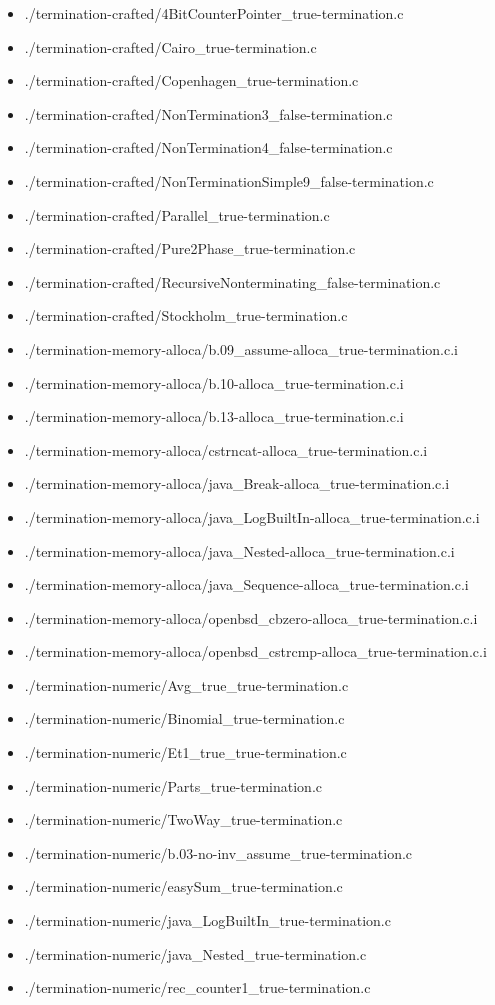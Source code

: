 \documentclass[envcountsame]{llncs}
\begin{document}
\begin{itemize}
\item ./termination-crafted/4BitCounterPointer\_true-termination.c
\item ./termination-crafted/Cairo\_true-termination.c
\item ./termination-crafted/Copenhagen\_true-termination.c
\item ./termination-crafted/NonTermination3\_false-termination.c
\item ./termination-crafted/NonTermination4\_false-termination.c
\item ./termination-crafted/NonTerminationSimple9\_false-termination.c
\item ./termination-crafted/Parallel\_true-termination.c
\item ./termination-crafted/Pure2Phase\_true-termination.c
\item ./termination-crafted/RecursiveNonterminating\_false-termination.c
\item ./termination-crafted/Stockholm\_true-termination.c


\item ./termination-memory-alloca/b.09\_assume-alloca\_true-termination.c.i
\item ./termination-memory-alloca/b.10-alloca\_true-termination.c.i
\item ./termination-memory-alloca/b.13-alloca\_true-termination.c.i
\item ./termination-memory-alloca/cstrncat-alloca\_true-termination.c.i
\item ./termination-memory-alloca/java\_Break-alloca\_true-termination.c.i
\item ./termination-memory-alloca/java\_LogBuiltIn-alloca\_true-termination.c.i
\item ./termination-memory-alloca/java\_Nested-alloca\_true-termination.c.i
\item ./termination-memory-alloca/java\_Sequence-alloca\_true-termination.c.i
\item ./termination-memory-alloca/openbsd\_cbzero-alloca\_true-termination.c.i
\item ./termination-memory-alloca/openbsd\_cstrcmp-alloca\_true-termination.c.i


\item ./termination-numeric/Avg\_true\_true-termination.c
\item ./termination-numeric/Binomial\_true-termination.c
\item ./termination-numeric/Et1\_true\_true-termination.c
\item ./termination-numeric/Parts\_true-termination.c
\item ./termination-numeric/TwoWay\_true-termination.c
\item ./termination-numeric/b.03-no-inv\_assume\_true-termination.c
\item ./termination-numeric/easySum\_true-termination.c
\item ./termination-numeric/java\_LogBuiltIn\_true-termination.c
\item ./termination-numeric/java\_Nested\_true-termination.c
\item ./termination-numeric/rec\_counter1\_true-termination.c
\end{itemize}

 
\end{document}
